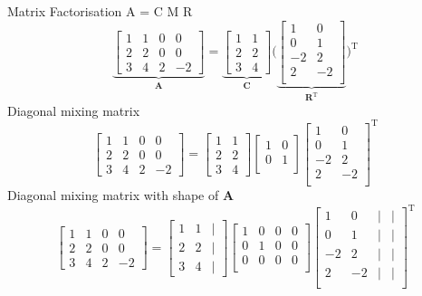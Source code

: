 \documentclass[mathserif, aspectratio=1610]{intbeamer}
\begin{document}
\begin{frame}{Matrix Factorisation A = C M R}
\vspace{-1em}
$$
\underbrace{
\begin{bmatrix}
1 & 1 & 0 & 0\\
2 & 2 & 0 & 0\\
3 & 4 & 2 & -2
\end{bmatrix}
}_{\bm{A}}
=
\underbrace{
\begin{bmatrix}
1 & 1\\
2 & 2\\
3 & 4
\end{bmatrix}
}_{\bm{C}}
\big(
\underbrace{
\begin{bmatrix}
1&0\\
0&1\\
-2&2\\
2&-2\\
\end{bmatrix}
}_{\bm{R}^\mathrm{T}}
\big)
^\mathrm{T}
$$
\pause
Diagonal mixing matrix
$$
\begin{bmatrix}
1 & 1 & 0 & 0\\
2 & 2 & 0 & 0\\
3 & 4 & 2 & -2
\end{bmatrix}
=
\begin{bmatrix}
1 & 1\\
2 & 2\\
3 & 4
\end{bmatrix}
\begin{bmatrix}
1 & 0 \\
0 & 1 \\
\end{bmatrix}
\begin{bmatrix}
1&0\\
0&1\\
-2&2\\
2&-2\\
\end{bmatrix}
^\mathrm{T}
$$
\pause
Diagonal mixing matrix with shape of $\bm{A}$
$$
\begin{bmatrix}
1 & 1 & 0 & 0\\
2 & 2 & 0 & 0\\
3 & 4 & 2 & -2
\end{bmatrix}
=
\begin{bmatrix}
1 & 1 & |\\
2 & 2 & |\\
3 & 4 & |
\end{bmatrix}
\begin{bmatrix}
1 & 0 & 0 & 0\\
0 & 1 & 0 & 0\\
0 & 0 & 0 & 0\\
\end{bmatrix}
\begin{bmatrix}
1&0 & | & |\\
0&1 & | & |\\
-2&2 & | & |\\
2&-2 & | & |\\
\end{bmatrix}
^\mathrm{T}
$$

\end{frame}
\end{document}
